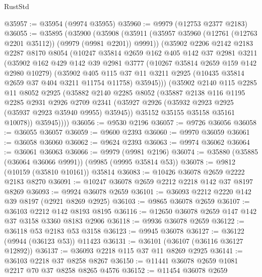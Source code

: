 \begin{lexlean}{RustStd}
\begin{coremodule}
@35957 := @35954 (@9974 @35955)
@35960 := @9979 (@12753 @2377 @2183)
@36055 := @35895
    (@35900
      (@35908
        (@35911 (@35957 @35960 (@12761 (@12763 @2201 @35112)) (@9979 (@9981 @2201)) @9991))
        (@35902
          @2206
          @2142
          @2183
          @2287
          @8170
          @8054
          (@10247
            @35814
            @2659
            @162
            @405
            @142
            @37
            @2981
            @3211
            (@35902
              @162
              @429
              @142
              @39
              @2981
              @3777
              (@10267 @35814 @2659 @159 @142 @2980 @10279)
              (@35902
                @405
                @115
                @37
                @11
                @3211
                @2925
                (@10435 @35814 @2659 @37 @404 @3211 @11754 @11758)
                @35945)))
          (@35902
            @2140
            @115
            @2285
            @11
            @8052
            @2925
            (@35882
              @2140
              @2285
              @8052
              (@35887
                @2138
                @116
                @1195
                @2285
                @2931
                @2926
                @2709
                @2341
                (@35927 @2926 (@35932 @2923 @2925 (@35937 @2923 @35940 @9955) @35945))
                @35152
                @35155
                @35158
                @35161
                @10078))
            @35945))))
@36056 := @9530 @2196
@36057 := @9726 @36056
@36058 := @36055 @36057
@36059 := @9600 @2393
@36060 := @9970 @36059
@36061 := @36058 @36060
@36062 := @9624 @2393
@36063 := @9974 @36062
@36064 := @36061 @36063
@36066 := @9979 (@9981 @2196)
@36074 := @35880 (@35885 (@36064 @36066 @9991)) (@9985 (@9995 @35814 @53))
@36078 := @9812 (@10159 (@35810 @10161)) @35814
@36083 := @10426 @36078 @2659 @2222 @2183 @8270
@36091 := @10247 @36078 @2659 @2212 @2218 @142 @37 @8197 @8269
@36093 := @9924 @36078 @2659
@36101 := @36093 @2212 @2220 @142 @39 @8197 (@2921 @8269 @2925)
@36103 := @9865 @36078 @2659
@36107 := @36103 @2212 @142 @8193 @8195
@36116 := @12650 @36078 @2659 @147 @142 @37 @3158 @3360 @8183 @2906
@36118 := @9936 @36078 @2659
@36122 := @36118 @53 @2183 @53 @3158
@36123 := @9945 @36078
@36127 := @36122 (@9944 (@36123 @53)) @11423
@36131 := @36101 (@36107 (@36116 @36127 @12892))
@36137 := @36093 @2218 @115 @37 @11 @8269 @2925
@36141 := @36103 @2218 @37 @8258 @8267
@36150 := @11441 @36078 @2659 @1081 @2217 @70 @37 @8258 @8265 @4576
@36152 := @11454 @36078 @2659

\end{coremodule}
\end{lexlean}
